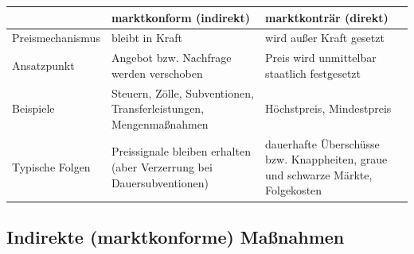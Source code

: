 \documentclass[11pt, a4paper]{article}
\begin{document}
\begin{center}
\begin{tabular}{p{3.2cm} p{5.2cm} p{5.2cm}}
\toprule
\rowcolor{bfwTabHead} & \textbf{marktkonform (indirekt)} & \textbf{marktkonträr (direkt)}\\
\midrule
Preismechanismus & bleibt in Kraft & wird außer Kraft gesetzt\\
Ansatzpunkt & Angebot bzw. Nachfrage werden verschoben & Preis wird unmittelbar staatlich festgesetzt\\
Beispiele & Steuern, Zölle, Subventionen, Transferleistungen, Mengenmaßnahmen & Höchstpreis, Mindestpreis\\
Typische Folgen & Preissignale bleiben erhalten (aber Verzerrung bei Dauersubventionen) & dauerhafte Überschüsse bzw. Knappheiten, graue und schwarze Märkte, Folgekosten\\
\bottomrule
\end{tabular}
\end{center}

\subsection{Indirekte (marktkonforme) Maßnahmen}
\end{document}
